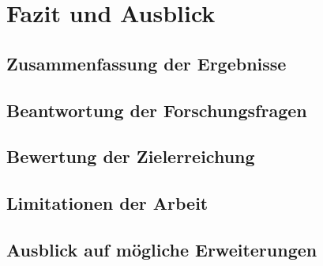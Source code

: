 \chapter{Fazit und Ausblick}
\section{Zusammenfassung der Ergebnisse}
\section{Beantwortung der Forschungsfragen}
\section{Bewertung der Zielerreichung}
\section{Limitationen der Arbeit}
\section{Ausblick auf mögliche Erweiterungen}
